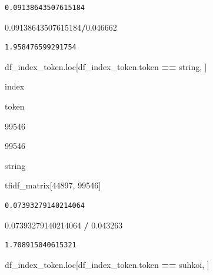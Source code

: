 \documentclass[
  11pt,
  a4paper,
]{article}
\newenvironment{Shaded}{\begin{snugshade}}{\end{snugshade}}
\newcommand{\DecValTok}[1]{\textcolor[rgb]{0.00,0.00,0.81}{#1}}
\newcommand{\FloatTok}[1]{\textcolor[rgb]{0.00,0.00,0.81}{#1}}
\newcommand{\NormalTok}[1]{#1}
\newcommand{\OperatorTok}[1]{\textcolor[rgb]{0.81,0.36,0.00}{\textbf{#1}}}
\newcommand{\StringTok}[1]{\textcolor[rgb]{0.31,0.60,0.02}{#1}}
\begin{document}
\begin{verbatim}
0.09138643507615184
\end{verbatim}

\begin{Shaded}
\begin{Highlighting}[]
\FloatTok{0.09138643507615184}\OperatorTok{/}\FloatTok{0.046662}
\end{Highlighting}
\end{Shaded}

\begin{verbatim}
1.958476599291754
\end{verbatim}

\begin{Shaded}
\begin{Highlighting}[]
\NormalTok{df\_index\_token.loc[df\_index\_token.token }\OperatorTok{==} \StringTok{\textquotesingle{}string\textquotesingle{}}\NormalTok{, ]}
\end{Highlighting}
\end{Shaded}

index

token

99546

99546

string

\begin{Shaded}
\begin{Highlighting}[]
\NormalTok{tfidf\_matrix[}\DecValTok{44897}\NormalTok{, }\DecValTok{99546}\NormalTok{]}
\end{Highlighting}
\end{Shaded}

\begin{verbatim}
0.07393279140214064
\end{verbatim}

\begin{Shaded}
\begin{Highlighting}[]
\FloatTok{0.07393279140214064} \OperatorTok{/} \FloatTok{0.043263}
\end{Highlighting}
\end{Shaded}

\begin{verbatim}
1.708915040615321
\end{verbatim}

\begin{Shaded}
\begin{Highlighting}[]
\NormalTok{df\_index\_token.loc[df\_index\_token.token }\OperatorTok{==} \StringTok{\textquotesingle{}suhkoi\textquotesingle{}}\NormalTok{, ]}
\end{Highlighting}
\end{Shaded}
\end{document}
